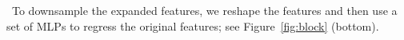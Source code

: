  \
To downsample the expanded features, we reshape the features and then use a set of MLPs to regress the original features; see Figure~\ref{fig:block} (bottom).






%


